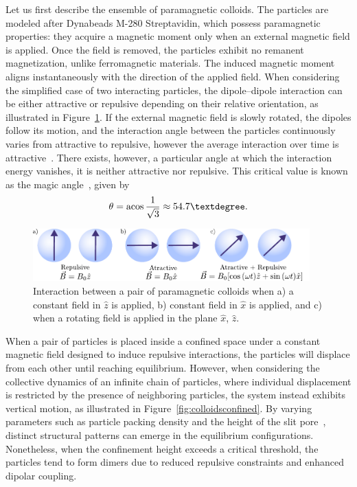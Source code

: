 Let us first describe the ensemble of paramagnetic colloids. The particles are modeled after Dynabeads M-280 Streptavidin, which possess paramagnetic properties: they acquire a magnetic moment only when an external magnetic field is applied. Once the field is removed, the particles exhibit no remanent magnetization, unlike ferromagnetic materials. The induced magnetic moment aligns instantaneously with the direction of the applied field.
When considering the simplified case of two interacting particles, the dipole–dipole interaction can be either attractive or repulsive depending on their relative orientation, as illustrated in Figure~\ref{fig:pairinteraction}. If the external magnetic field is slowly rotated, the dipoles follow its motion, and the interaction angle between the particles continuously varies from attractive to repulsive, however the average interaction over time is attractive~\cite{massana2019tunable}. There exists, however, a particular angle at which the interaction energy vanishes, it is neither attractive nor repulsive. This critical value is known as the magic angle~\cite{erickson1993magic, hennel2004magic}, given by
\[ \theta = \acos{\frac{1}{\sqrt{3}}} \approx 54.7°.  \]

\begin{figure}
  \begin{center}
    \includegraphics[width=0.95\textwidth]{figures/colloidsdynamics1.pdf}
  \end{center}
  \caption[Basic interaction for a pair of paramagnetic colloids.]{Interaction between a pair of paramagnetic colloids when a) a constant field in $\hat{z}$ is applied, b) constant field in $\hat{x}$ is applied, and c) when a rotating field is applied in the plane $\hat{x}$, $\hat{z}$.}\label{fig:pairinteraction}
\end{figure}

When a pair of particles is placed inside a confined space under a constant magnetic field designed to induce repulsive interactions, the particles will displace from each other until reaching equilibrium. However, when considering the collective dynamics of an infinite chain of particles, where individual displacement is restricted by the presence of neighboring particles, the system instead exhibits vertical motion, as illustrated in Figure~\ref{fig:colloidsconfined}. By varying parameters such as particle packing density and the height of the slit pore~\cite{osterman2007observation}, distinct structural patterns can emerge in the equilibrium configurations. Nonetheless, when the confinement height exceeds a critical threshold, the particles tend to form dimers due to reduced repulsive constraints and enhanced dipolar coupling.

